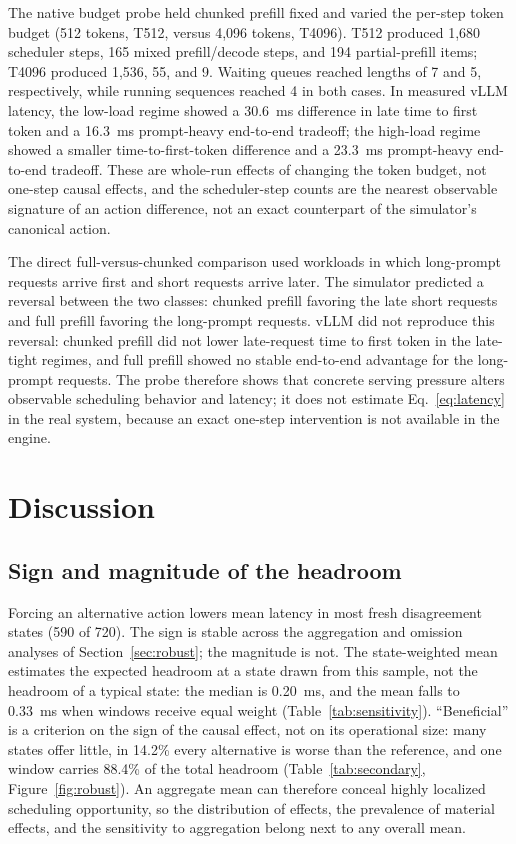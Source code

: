\documentclass[preprint,12pt]{elsarticle}
\begin{document}
The native budget probe held chunked prefill fixed and varied the per-step
token budget (512 tokens, T512, versus 4,096 tokens, T4096). T512 produced
1,680 scheduler steps, 165 mixed prefill/decode steps, and 194 partial-prefill
items; T4096 produced 1,536, 55, and 9. Waiting queues reached lengths of 7 and
5, respectively, while running sequences reached 4 in both cases. In measured vLLM latency, the low-load
regime showed a 30.6~ms difference in late time to first token and a 16.3~ms
prompt-heavy end-to-end tradeoff; the high-load regime showed a smaller
time-to-first-token difference and a 23.3~ms prompt-heavy end-to-end tradeoff.
These are whole-run effects of changing the token budget, not one-step causal
effects, and the scheduler-step counts are the nearest observable signature of
an action difference, not an exact counterpart of the simulator's canonical
action.

The direct full-versus-chunked comparison used workloads in which long-prompt
requests arrive first and short requests arrive later. The simulator predicted
a reversal between the two classes: chunked prefill favoring the late short
requests and full prefill favoring the long-prompt requests. vLLM did not
reproduce this reversal: chunked prefill did not lower late-request time to
first token in the late-tight regimes, and full prefill showed no stable
end-to-end advantage for the long-prompt requests. The probe therefore shows
that concrete serving pressure alters observable scheduling behavior and
latency; it does not estimate Eq.~\ref{eq:latency} in the real system, because
an exact one-step intervention is not available in the engine.

\section{Discussion}
\label{sec:discussion}

\subsection{Sign and magnitude of the headroom}
Forcing an alternative action lowers mean latency in most fresh disagreement
states (590 of 720). The sign is stable across the aggregation and omission analyses of
Section~\ref{sec:robust}; the magnitude is not. The state-weighted mean
estimates the expected headroom at a state drawn from this sample, not the
headroom of a typical state: the median is 0.20~ms, and the mean
falls to 0.33~ms when windows receive equal weight
(Table~\ref{tab:sensitivity}). ``Beneficial'' is a criterion on the
sign of the causal effect, not on its operational size: many states offer little,
in 14.2\% every alternative is worse than the reference, and one window carries
88.4\% of the total headroom
(Table~\ref{tab:secondary}, Figure~\ref{fig:robust}). An aggregate mean can
therefore conceal highly localized scheduling opportunity, so the
distribution of effects, the prevalence of material effects, and the sensitivity
to aggregation belong next to any overall mean.
\end{document}
